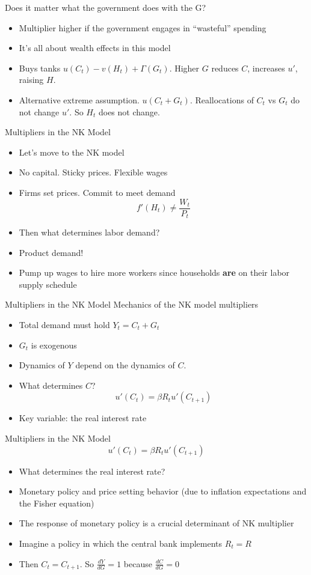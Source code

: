 \documentclass[11pt,aspectratio=169,xcolor={dvipsnames},hyperref={pdftex,pdfpagemode=UseNone,hidelinks,pdfdisplaydoctitle=true},usepdftitle=false]{beamer}
\begin{document}
\begin{frame}{Does it matter what the government does with the G?}
\begin{itemize}
\item Multiplier higher if the government engages in ``wasteful'' spending
\item It's all about wealth effects in this model
\item Buys tanks
$u(C_t) - v(H_t) + \Gamma(G_t)$. Higher $G$ reduces $C$, increases $u'$, raising $H$.
\item Alternative extreme assumption.
$u(C_t + G_t)$. Reallocations of $C_t$ vs $G_t$ do not change $u'$. So $H_t$ does not change.
\end{itemize}
\end{frame}


\begin{frame}{Multipliers in the NK Model}
\begin{itemize}
\item Let's move to the NK model
\item No capital. Sticky prices. Flexible wages
\item Firms set prices. Commit to meet demand
$$f'(H_t) \neq \frac{W_t}{P_t}$$
\item Then what determines labor demand?
\pause
\item Product demand!
\item Pump up wages to hire more workers since households \textbf{are} on their labor supply schedule
\end{itemize}
\end{frame}




\begin{frame}{Multipliers in the NK Model}
Mechanics of the NK model multipliers
\begin{itemize}
\item Total demand must hold $Y_t = C_t + G_t$
\item $G_t$ is exogenous
\item Dynamics of $Y$ depend on the dynamics of $C$.
\item What determines $C$?
$$u'(C_t) = \beta R_t u'(C_{t+1})$$
\item Key variable: the real interest rate
\end{itemize}
\end{frame}


\begin{frame}{Multipliers in the NK Model}
$$u'(C_t) = \beta R_t u'(C_{t+1})$$
\begin{itemize}
\item What determines the real interest rate?
\pause
\item Monetary policy and price setting behavior (due to inflation expectations and the Fisher equation)
\item The response of monetary policy is a crucial determinant of NK multiplier	
\item Imagine a policy in which the central bank implements $R_t = R$
\item Then $C_t = C_{t+1}$. So $\frac{dY}{dG} = 1$ because $\frac{dC}{dG} = 0$
\end{itemize}
\end{frame}
\end{document}
